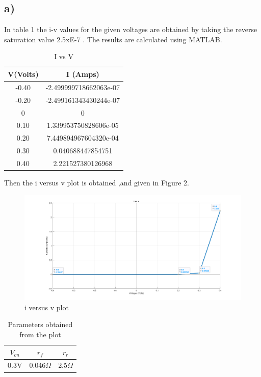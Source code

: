 \documentclass[letterpaper,12pt]{article}
\begin{document}
\subsection{a)}
In table 1 the i-v values for the given voltages are obtained by taking the reverse saturation value 2.5xE-7 . The results are calculated using MATLAB.

\begin{table}[H]
\begin{center}
\caption{ I vs V}
\vspace{2mm}
\begin{tabular}{||c | c ||} 
\hline
V(Volts) & I (Amps) \\ [0.5ex] 
\hline\hline
-0.40 & -2.499999718662063e-07  \\ 
\hline
-0.20 & -2.499161343430244e-07  \\ 
\hline
0 & 0  \\ 
\hline
0.10 & 1.339953750828606e-05  \\ 
\hline
0.20 & 7.449894967604320e-04  \\ 
\hline
0.30 & 0.040688447854751  \\ 
\hline
0.40 & 2.221527380126968  \\ 
\hline
\end{tabular}
\end{center}
\end{table}
Then the i versus v plot is obtained ,and given in Figure 2.

\begin{figure}[H]
\centering
\includegraphics[width=1\textwidth]{3a.png}
\caption{i versus v plot}
\end{figure} 
    
\begin{table}[H]
    \begin{center}
    \caption{ Parameters obtained from the plot}
    \vspace{2mm}
    \begin{tabular}{||c | c | c ||} 
    \hline
    \(V_{on}\) &  \(r_f\) & \(r_r\)\\ [0.5ex] 
    \hline\hline
    0.3V & 0.046\(\Omega\)  & 2.5\(\Omega\)   \\ 
    
\hline
\end{tabular}
\end{center}
\end{table}
    
\end{document}
